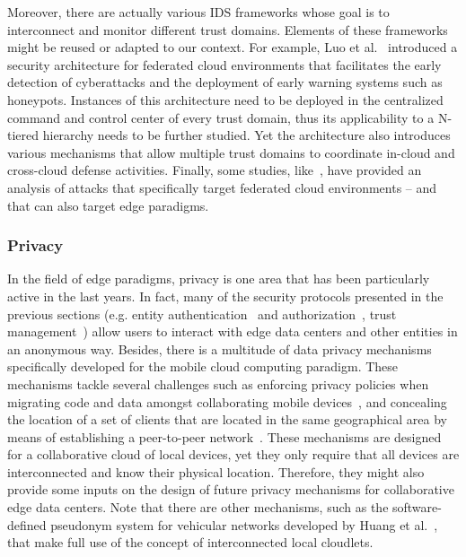 \documentclass[twocolumn,preprint,3p]{elsarticle}
\begin{document}
Moreover, there are actually various IDS frameworks whose goal is to interconnect and monitor different trust domains. Elements of these frameworks might be reused or adapted to our context. For example, Luo et al.~\cite{LuoFIDS13} introduced a security architecture for federated cloud environments that facilitates the early detection of cyberattacks and the deployment of early warning systems such as honeypots. Instances of this architecture need to be deployed in the centralized command and control center of every trust domain, thus its applicability to a N-tiered hierarchy needs to be further studied. Yet the architecture also introduces various mechanisms that allow multiple trust domains to coordinate in-cloud and cross-cloud defense activities. Finally, some studies, like~\cite{Encina14}, have provided an analysis of attacks that specifically target federated cloud environments -- and that can also target edge paradigms.

\subsubsection{Privacy}

In the field of edge paradigms, privacy is one area that has been particularly active in the last years. In fact, many of the security protocols presented in the previous sections (e.g. entity authentication~\cite{Tsai15} and authorization~\cite{StojmenovicFSec05,Liqun15}, trust management~\cite{HussainT14}) allow users to interact with edge data centers and other entities in an anonymous way. Besides, there is a multitude of data privacy mechanisms specifically developed for the mobile cloud computing paradigm. These mechanisms tackle several challenges such as enforcing privacy policies when migrating code and data amongst collaborating mobile devices~\cite{Ravichandran15}, and concealing the location of a set of clients that are located in the same geographical area by means of establishing a peer-to-peer network~\cite{ZhangMCC15}. These mechanisms are designed for a collaborative cloud of local devices, yet they only require that all devices are interconnected and know their physical location. Therefore, they might also provide some inputs on the design of future privacy mechanisms for collaborative edge data centers. Note that there are other mechanisms, such as the software-defined pseudonym system for vehicular networks developed by Huang et al.~\cite{HuangVN16}, that make full use of the concept of interconnected local cloudlets.
\end{document}

